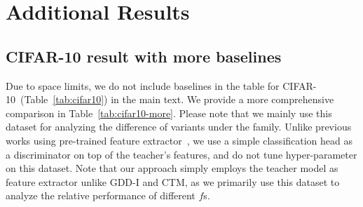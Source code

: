 \section{Additional Results}
\label{app:results}
\subsection{CIFAR-10 result with more baselines}


Due to space limits, we do not include baselines in the table for CIFAR-10~(Table~\ref{tab:cifar10}) in the main text. We provide a more comprehensive comparison in Table~\ref{tab:cifar10-more}. Please note that we mainly use this dataset for analyzing the difference of variants under the \methodtext family. Unlike previous works using pre-trained feature extractor~\cite{Kim2023ConsistencyTM, zheng2024diffusion}, we use a simple classification head as a discriminator on top of the teacher's features, and do not tune hyper-parameter on this dataset. Note that our approach simply employs the teacher model as feature extractor unlike GDD-I and CTM, as we primarily use this dataset to analyze the relative performance of different $f$s.


